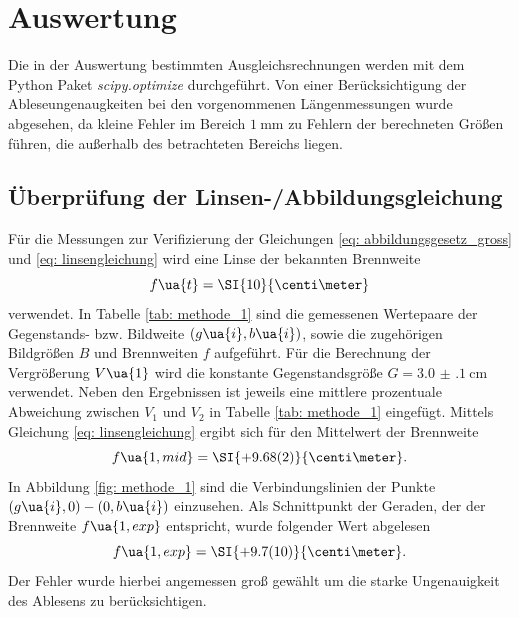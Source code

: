 \section{Auswertung}
Die in der Auswertung bestimmten Ausgleichsrechnungen werden mit
dem Python Paket \emph{scipy.optimize}\cite{scipy} durchgeführt.
Von einer Berücksichtigung der Ableseungenaugkeiten bei den vorgenommenen Längenmessungen
wurde abgesehen, da kleine Fehler im Bereich $\SI{1}{\milli\meter}$ zu Fehlern der berechneten Größen führen,
die außerhalb des betrachteten Bereichs liegen.   %
\subsection{Überprüfung der Linsen-/Abbildungsgleichung}
Für die Messungen zur Verifizierung der Gleichungen \eqref{eq: abbildungsgesetz_gross} und \eqref{eq: linsengleichung} wird eine Linse
der bekannten Brennweite
\begin{equation}
  f\ua{t} = \SI{10}{\centi\meter}
\end{equation}
verwendet. In Tabelle \ref{tab: methode_1} sind die gemessenen Wertepaare der Gegenstands- bzw. Bildweite $(g\ua{i}, b\ua{i})$,
sowie die zugehörigen Bildgrößen $B$ und Brennweiten $f$ aufgeführt. Für die Berechnung der Vergrößerung $V\ua{1}$
wird die konstante Gegenstandsgröße $G = \SI{3.0(1)}{\centi\meter}$ verwendet. Neben den Ergebnissen ist jeweils
eine mittlere prozentuale Abweichung zwischen $V_1$ und $V_2$ in Tabelle \ref{tab: methode_1} eingefügt.
Mittels Gleichung \eqref{eq: linsengleichung} ergibt sich für den Mittelwert der Brennweite
\begin{equation}
  f\ua{1, mid} = \SI{+9.68(2)}{\centi\meter}.
\end{equation}
In Abbildung \ref{fig: methode_1} sind die Verbindungslinien der Punkte $(g\ua{i}, 0)-(0, b\ua{i})$ einzusehen. Als Schnittpunkt
der Geraden, der der Brennweite $f\ua{1, exp}$ entspricht, wurde folgender Wert abgelesen
\begin{equation}
  f\ua{1, exp} = \SI{+9.7(10)}{\centi\meter}.
\end{equation}
Der Fehler wurde hierbei angemessen groß gewählt um die starke Ungenauigkeit des Ablesens zu berücksichtigen.
